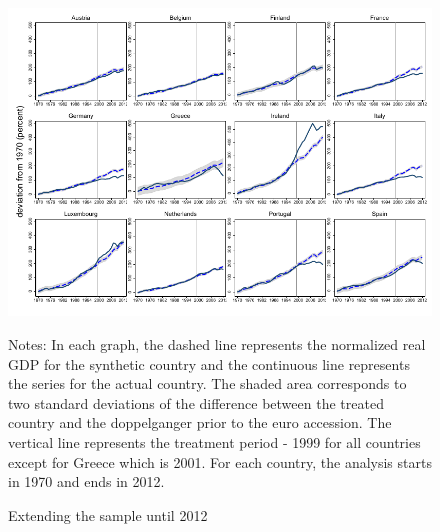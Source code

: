 \documentclass[12pt]{article}
\newcommand{\annote}[1]{\parbox{\textwidth}{\renewcommand{\baselinestretch}{1.0}\vspace{12pt} \small Notes: #1}}
\begin{document}
\begin{appendices}
\begin{figure}[h!]
    \centering
    \caption{Extending the sample until 2012}
    \label{F_GFC}
    \includegraphics[width=\textwidth]{Output/Figures/SCM_gdp_2012_Annual.pdf}
    \annote{In each graph, the dashed line represents the normalized real GDP for the synthetic country and the continuous line represents the series for the actual country. The shaded area corresponds to two standard deviations of the difference between the treated country and the doppelganger prior to the euro accession. The vertical line represents the treatment period - 1999 for all countries except for Greece which is 2001. For each country, the analysis starts in 1970 and ends in 2012.}
\end{figure}

\clearpage
\begin{landscape}

\end{landscape}
\end{appendices}
\end{document}
